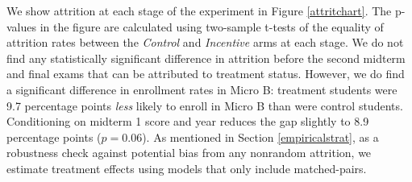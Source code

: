 \documentclass[12pt]{article}
\begin{document}
We show attrition at each stage of the experiment in Figure \ref{attritchart}. The p-values in the figure are calculated using two-sample t-tests of the equality of attrition rates between the \textit{Control} and \textit{Incentive} arms at each stage. We do not find any statistically significant difference in attrition before the second midterm and final exams that can be attributed to treatment status. However, we do find a significant difference in enrollment rates in Micro B: treatment students were 9.7 percentage points \textit{less} likely to enroll in Micro B than were control students. Conditioning on midterm 1 score and year reduces the gap slightly to 8.9 percentage points ($p=0.06$). As mentioned in Section \ref{empiricalstrat}, as a robustness check against potential bias from any nonrandom attrition, we estimate treatment effects using models that only include matched-pairs.
\end{document}
